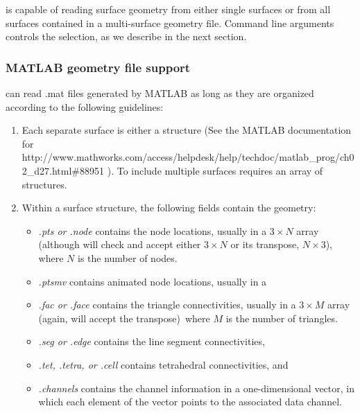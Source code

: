\map{} is capable of reading surface geometry from either single surfaces
or from all surfaces contained in a multi-surface geometry file. 
Command line arguments controls the selection, as we describe in the next
section.

\subsubsection{MATLAB geometry file support}
\label{sec:matlabgeom}

\map{} can read .mat files generated by MATLAB as long as they are
organized according to the following guidelines:
\begin{enumerate}
  \item Each separate surface is either a structure (See 
    the MATLAB documentation for 
    {http://www.mathworks.com/access/helpdesk/help/techdoc/matlab\_prog/ch02\_d27.html\#88951}
     ).  To include multiple surfaces requires an array of
    structures.
  \item Within a surface structure, the following fields contain the
    geometry:
    \begin{itemize}
      \item \emph{.pts or .node} contains the node locations, usually in a
        $3 \times N$ array (although \map{} will check and accept either $3
        \times N$ or its transpose, $N \times 3$), where $N$ is the number
        of nodes.
      \item \emph{.pts\textunderscore mv} contains animated node locations, usually in a
      \item \emph{.fac or .face} contains the triangle connectivities,
        usually in a $3 \times M$ array (again, \map{} will accept the
        transpose)\, where $M$ is the number of triangles.
      \item \emph{.seg or .edge} contains the line segment connectivities,
      \item \emph{.tet, .tetra, or .cell} contains tetrahedral
        connectivities, and
      \item \emph{.channels} contains the channel information in a
        one-dimensional vector, in which each element of the vector points
        to the associated data channel.
    \end{itemize}
\end{enumerate}

